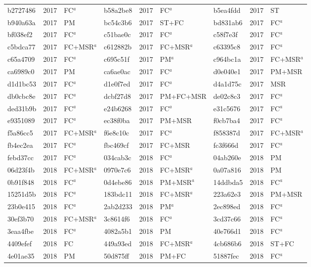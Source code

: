 \begin{longtable}{lll@{\hspace{10pt}}lll@{\hspace{10pt}}lll}
b2727486 & 2017 & FC$^{a}$ & b58a2be8 & 2017 & FC$^{a}$ & b5ea4fdd & 2017 & ST \\
b940a63a & 2017 & PM & bc54c3b6 & 2017 & ST+FC & bd831ab6 & 2017 & FC$^{a}$ \\
bf038ef2 & 2017 & FC$^{a}$ & c51bae0c & 2017 & FC$^{a}$ & c58f7e3f & 2017 & FC$^{a}$ \\
c5bdca77 & 2017 & FC+MSR$^{a}$ & c612882b & 2017 & FC+MSR$^{a}$ & c63395c8 & 2017 & FC$^{a}$ \\
c65a4709 & 2017 & FC$^{a}$ & c695c51f & 2017 & PM$^{a}$ & c964bc1a & 2017 & FC+MSR$^{a}$ \\
ca6989c0 & 2017 & PM & ca6ae0ac & 2017 & FC$^{a}$ & d0e040e1 & 2017 & PM+MSR \\
d1d1bc53 & 2017 & FC$^{a}$ & d1e0f7ed & 2017 & FC$^{a}$ & d4a1d75c & 2017 & MSR \\
db0cbc8e & 2017 & FC$^{a}$ & dcbf27d8 & 2017 & PM+FC+MSR & de02c8c3 & 2017 & FC$^{a}$ \\
ded31b9b & 2017 & FC$^{a}$ & e24b6268 & 2017 & FC$^{a}$ & e31c5676 & 2017 & FC$^{a}$ \\
e9351089 & 2017 & FC$^{a}$ & ec38f0ba & 2017 & PM+MSR & f0cb7ba4 & 2017 & FC$^{a}$ \\
f5a86cc5 & 2017 & FC+MSR$^{a}$ & f6e8c10c & 2017 & FC$^{a}$ & f858387d & 2017 & FC+MSR$^{a}$ \\
fb4ec2ea & 2017 & FC$^{a}$ & fbc469cf & 2017 & FC+MSR & fc3f666d & 2017 & FC$^{a}$ \\
febd37cc & 2017 & FC$^{a}$ & 034cab3c & 2018 & FC$^{a}$ & 04ab260e & 2018 & PM \\
06d23f4b & 2018 & FC+MSR$^{a}$ & 0970e7c6 & 2018 & FC+MSR$^{a}$ & 0a07a816 & 2018 & PM \\
0b91f848 & 2018 & FC$^{a}$ & 0d4ebe86 & 2018 & PM+MSR$^{a}$ & 14ddbda5 & 2018 & FC$^{a}$ \\
15251d5b & 2018 & FC$^{a}$ & 183bdc11 & 2018 & FC+MSR$^{a}$ & 223a62e3 & 2018 & PM+MSR \\
23b0e415 & 2018 & FC$^{a}$ & 2ab2d233 & 2018 & PM$^{a}$ & 2ec898ed & 2018 & FC$^{a}$ \\
30ef3b70 & 2018 & FC+MSR$^{a}$ & 3c8614f6 & 2018 & FC$^{a}$ & 3cd37c66 & 2018 & FC$^{a}$ \\
3eaa4fbe & 2018 & FC$^{a}$ & 4082a5b1 & 2018 & PM & 40e766d1 & 2018 & FC$^{a}$ \\
4409efef & 2018 & FC & 449a93ed & 2018 & FC+MSR$^{a}$ & 4cb686b6 & 2018 & ST+FC \\
4e01ae35 & 2018 & PM & 50d875ff & 2018 & PM+FC & 51887fec & 2018 & FC$^{a}$ \\

\end{longtable}
